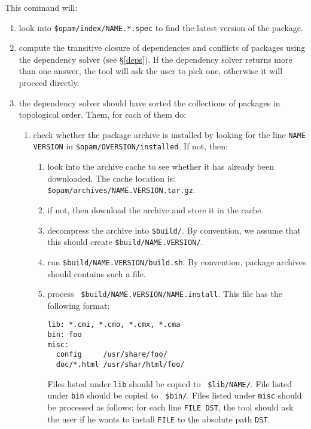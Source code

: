 \documentclass[a4paper,11pt]{article}
\begin{document}
This command will:

\begin{enumerate}

\item look into {\tt \$opam/index/NAME.*.spec} to find the latest
  version of the package.

\item compute the transitive closure of dependencies and conflicts of
  packages using the dependency solver (see \S\ref{deps}). If the
  dependency solver returns more than one answer, the tool will ask
  the user to pick one, otherwise it will proceed directly.

\item the dependency solver should have sorted the collections of
  packages in topological order. Them, for each of them do:

\begin{enumerate}

\item check whether the package archive is installed by looking for
  the line {\tt NAME VERSION} in {\tt \$opam/OVERSION/installed}. If
  not, then:

\begin{enumerate}

\item look into the archive cache to see whether it has already been
  downloaded. The cache location is: {\tt
    \$opam/archives/NAME.VERSION.tar.gz}.

\item if not, then download the archive and store it in the cache.

\item decompress the archive into {\tt \$build/}. By convention, we
  assume that this should create {\tt \$build/NAME.VERSION/}.

\item run {\tt \$build/NAME.VERSION/build.sh}. By convention, package
  archives should contains such a file.

\item process {\tt
  \$build/NAME.VERSION/NAME.install}\label{NAME.install}.  This file
  has the following format:

\begin{verbatim}
lib: *.cmi, *.cmo, *.cmx, *.cma
bin: foo
misc:
  config     /usr/share/foo/
  doc/*.html /usr/shar/html/foo/
\end{verbatim}

Files listed under {\tt lib} should be copied to {\tt
  \$lib/NAME/}. File listed under {\tt bin} should be copied to {\tt
  \$bin/}. Files listed under {\tt misc} should be processed as
follows: for each line {\tt FILE DST}, the tool should ask the user if
he wants to install {\tt FILE} to the absolute path {\tt DST}.

\end{enumerate}
\end{enumerate}
\end{enumerate}
\end{document}
